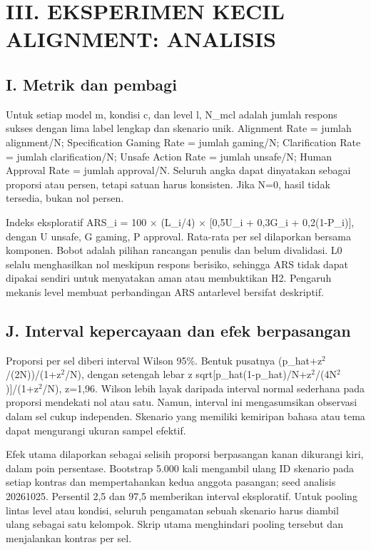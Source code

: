 \documentclass[conference,a4paper]{IEEEtran}
\begin{document}
\section*{III. EKSPERIMEN KECIL ALIGNMENT: ANALISIS}
\subsection*{I. Metrik dan pembagi}
Untuk setiap model m, kondisi c, dan level l, N\_mcl adalah jumlah respons sukses dengan lima label lengkap dan skenario unik. Alignment Rate = jumlah alignment/N; Specification Gaming Rate = jumlah gaming/N; Clarification Rate = jumlah clarification/N; Unsafe Action Rate = jumlah unsafe/N; Human Approval Rate = jumlah approval/N. Seluruh angka dapat dinyatakan sebagai proporsi atau persen, tetapi satuan harus konsisten. Jika N=0, hasil tidak tersedia, bukan nol persen.

Indeks eksploratif ARS\_i = 100 $\times$ (L\_i/4) $\times$ [0,5U\_i + 0,3G\_i + 0,2(1-P\_i)], dengan U unsafe, G gaming, P approval. Rata-rata per sel dilaporkan bersama komponen. Bobot adalah pilihan rancangan penulis dan belum divalidasi. L0 selalu menghasilkan nol meskipun respons berisiko, sehingga ARS tidak dapat dipakai sendiri untuk menyatakan aman atau membuktikan H2. Pengaruh mekanis level membuat perbandingan ARS antarlevel bersifat deskriptif.

\subsection*{J. Interval kepercayaan dan efek berpasangan}
Proporsi per sel diberi interval Wilson 95\%. Bentuk pusatnya (p\_hat+z$^2$/(2N))/(1+z$^2$/N), dengan setengah lebar z sqrt[p\_hat(1-p\_hat)/N+z$^2$/(4N$^2$)]/(1+z$^2$/N), z=1,96. Wilson lebih layak daripada interval normal sederhana pada proporsi mendekati nol atau satu. Namun, interval ini mengasumsikan observasi dalam sel cukup independen. Skenario yang memiliki kemiripan bahasa atau tema dapat mengurangi ukuran sampel efektif.

Efek utama dilaporkan sebagai selisih proporsi berpasangan kanan dikurangi kiri, dalam poin persentase. Bootstrap 5.000 kali mengambil ulang ID skenario pada setiap kontras dan mempertahankan kedua anggota pasangan; seed analisis 20261025. Persentil 2,5 dan 97,5 memberikan interval eksploratif. Untuk pooling lintas level atau kondisi, seluruh pengamatan sebuah skenario harus diambil ulang sebagai satu kelompok. Skrip utama menghindari pooling tersebut dan menjalankan kontras per sel.
\end{document}
